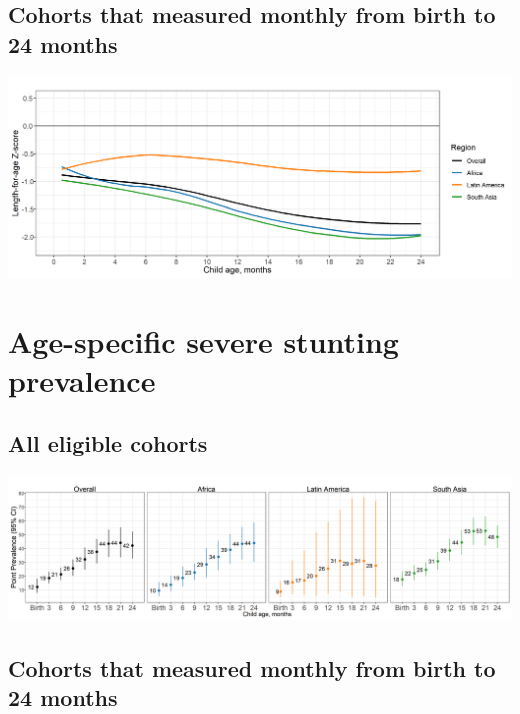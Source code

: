 \documentclass[9pt,]{book}
\begin{document}
\hypertarget{cohorts-that-measured-monthly-from-birth-to-24-months}{%
\subsection{Cohorts that measured monthly from birth to 24 months}\label{cohorts-that-measured-monthly-from-birth-to-24-months}}

\includegraphics[width=41.67in]{figure-copies/fig-laz-2-mean-overall_region--allage-month24}

\hypertarget{age-specific-severe-stunting-prevalence-1}{%
\section{Age-specific severe stunting prevalence}\label{age-specific-severe-stunting-prevalence-1}}

\hypertarget{all-eligible-cohorts-1}{%
\subsection{All eligible cohorts}\label{all-eligible-cohorts-1}}

\includegraphics[width=58.33in]{figure-copies/fig-stunt-2-prev-overall_region--allage-primary}

\hypertarget{cohorts-that-measured-monthly-from-birth-to-24-months-1}{%
\subsection{Cohorts that measured monthly from birth to 24 months}\label{cohorts-that-measured-monthly-from-birth-to-24-months-1}}
\end{document}
